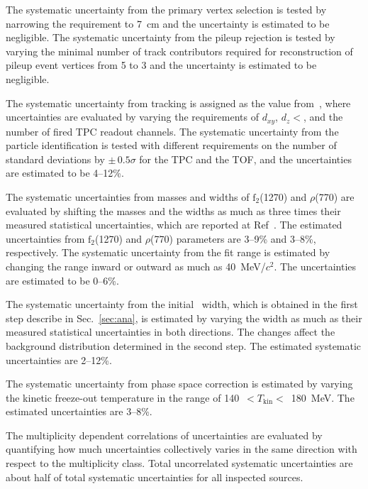 The systematic uncertainty from the primary vertex selection is tested by narrowing the requirement to 7~cm and the uncertainty is estimated to be negligible. The systematic uncertainty from the pileup rejection is tested by varying the minimal number of track contributors required for reconstruction of pileup event vertices from 5 to 3 and the uncertainty is estimated to be negligible.

The systematic uncertainty from tracking is assigned as the value from~\cite{ALICE:2013wgn}, where uncertainties are evaluated by varying the requirements of $d_{xy}$, $d_{z}<$, and the number of fired TPC readout channels. The systematic uncertainty from the particle identification is tested with different requirements on the number of standard deviations by $\pm\,0.5\sigma$ for the TPC and the TOF, and the uncertainties are estimated to be 4--12\%.

The systematic uncertainties from masses and widths of $\mathrm{f}_{2}$(1270) and $\rho$(770) are evaluated by shifting the masses and the widths as much as three times their measured statistical uncertainties, which are reported at Ref~\cite{ParticleDataGroup:2020ssz}. The estimated uncertainties from $\mathrm{f}_{2}$(1270) and $\rho$(770) parameters are 3--9\% and 3--8\%, respectively. The systematic uncertainty from the fit range is estimated by changing the range inward or outward as much as 40~MeV/$c^{2}$. The uncertainties are estimated to be 0--6\%.

The systematic uncertainty from the initial \fzero~width, which is obtained in the first step describe in Sec.~\ref{sec:ana}, is estimated by varying the width as much as their measured statistical uncertainties in both directions. The changes affect the background distribution determined in the second step. The estimated systematic uncertainties are 2--12\%.

The systematic uncertainty from phase space correction is estimated by varying the kinetic freeze-out temperature in the range of 140~$<T_{\mathrm{kin}}<$~180~MeV. The estimated uncertainties are 3--8\%. 

The multiplicity dependent correlations of uncertainties are evaluated by quantifying how much uncertainties collectively varies in the same direction with respect to the multiplicity class. Total uncorrelated systematic uncertainties are about half of total systematic uncertainties for all inspected sources.








